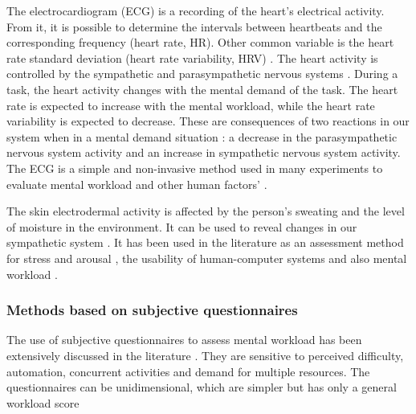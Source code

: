         The electrocardiogram (ECG) is a recording of the heart’s electrical activity. From it, it is possible to determine the intervals between heartbeats and the corresponding frequency (heart rate, HR). Other common variable is the heart rate standard deviation (heart rate variability, HRV) \cite{cain2007review}. The heart activity is controlled by the sympathetic and parasympathetic nervous systems \cite{stanton2004handbook}. During a task, the heart activity changes with the mental demand of the task. The heart rate is expected to increase with the mental workload, while the heart rate variability is expected to decrease. These are consequences of two reactions in our system when in a mental demand situation \cite{stanton2004handbook}: a decrease in the parasympathetic nervous system activity and an increase in sympathetic nervous system activity. The ECG is a simple and non-invasive method used in many experiments to evaluate mental workload and other human factors’ \cite{mohanavelu2020cognitive, mansikka2016fighter, zhang2014detection}.
                
         The skin electrodermal activity is affected by the person’s sweating and the level of moisture in the environment. It can be used to reveal changes in our sympathetic system \cite{nourbakhsh2012using, shi2007galvanic}. It has been used in the literature as an assessment method for stress and arousal \cite{nourbakhsh2012using, stanton2004handbook, shi2007galvanic}, the usability of human-computer systems \cite{shi2007galvanic} and also mental workload \cite{zhang2014detection, borghini2014measuring}.
    
    \subsubsection*{Methods based on subjective questionnaires}

        The use of subjective questionnaires to assess mental workload has been extensively discussed in the literature \cite{sanders1998human, stanton2004handbook}. They are sensitive to perceived difficulty, automation, concurrent activities and demand for multiple resources. The questionnaires can be unidimensional, which are simpler but has only a general workload score 

